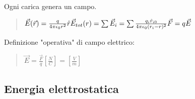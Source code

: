 \documentclass{book}
\begin{document}
Ogni carica genera un campo.
\begin{quote}
    \begin{math}
        \vec{E}(\vec{r}) = \frac{q}{4\pi\epsilon_0r^2}\hat{r}
        \newline\vec{E}_{tot}(r) = \sum\vec{E}_i = \sum \frac{q_i\hat{r}_{i0}}{4\pi\epsilon_0(r_i-r)^2}
        \newline\vec{F} = q\vec{E}
    \end{math}
\end{quote}
Definizione "operativa" di campo elettrico:
\begin{quote}
    \begin{math}
        \vec{E} = \frac{\vec{F}}{q} [\frac{N}{C}] = [\frac{V}{m}]
    \end{math}
\end{quote}

\subsection{Energia elettrostatica}
\end{document}
